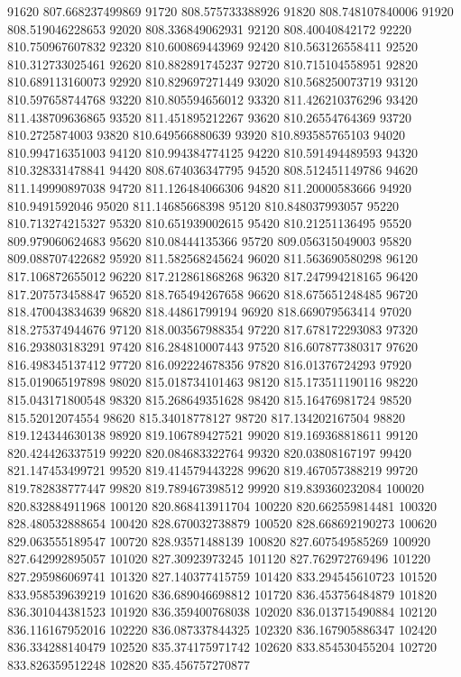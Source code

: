{91620 807.668237499869
91720 808.575733388926
91820 808.748107840006
91920 808.519046228653
92020 808.336849062931
92120 808.40040842172
92220 810.750967607832
92320 810.600869443969
92420 810.563126558411
92520 810.312733025461
92620 810.882891745237
92720 810.715104558951
92820 810.689113160073
92920 810.829697271449
93020 810.568250073719
93120 810.597658744768
93220 810.805594656012
93320 811.426210376296
93420 811.438709636865
93520 811.451895212267
93620 810.26554764369
93720 810.2725874003
93820 810.649566880639
93920 810.893585765103
94020 810.994716351003
94120 810.994384774125
94220 810.591494489593
94320 810.328331478841
94420 808.674036347795
94520 808.512451149786
94620 811.149990897038
94720 811.126484066306
94820 811.20000583666
94920 810.9491592046
95020 811.14685668398
95120 810.848037993057
95220 810.713274215327
95320 810.651939002615
95420 810.21251136495
95520 809.979060624683
95620 810.08444135366
95720 809.056315049003
95820 809.088707422682
95920 811.582568245624
96020 811.563690580298
96120 817.106872655012
96220 817.212861868268
96320 817.247994218165
96420 817.207573458847
96520 818.765494267658
96620 818.675651248485
96720 818.470043834639
96820 818.44861799194
96920 818.669079563414
97020 818.275374944676
97120 818.003567988354
97220 817.678172293083
97320 816.293803183291
97420 816.284810007443
97520 816.607877380317
97620 816.498345137412
97720 816.092224678356
97820 816.01376724293
97920 815.019065197898
98020 815.018734101463
98120 815.173511190116
98220 815.043171800548
98320 815.268649351628
98420 815.16476981724
98520 815.52012074554
98620 815.34018778127
98720 817.134202167504
98820 819.124344630138
98920 819.106789427521
99020 819.169368818611
99120 820.424426337519
99220 820.084683322764
99320 820.03808167197
99420 821.147453499721
99520 819.414579443228
99620 819.467057388219
99720 819.782838777447
99820 819.789467398512
99920 819.839360232084
100020 820.832884911968
100120 820.868413911704
100220 820.662559814481
100320 828.480532888654
100420 828.670032738879
100520 828.668692190273
100620 829.063555189547
100720 828.93571488139
100820 827.607549585269
100920 827.642992895057
101020 827.30923973245
101120 827.762972769496
101220 827.295986069741
101320 827.140377415759
101420 833.294545610723
101520 833.958539639219
101620 836.689046698812
101720 836.453756484879
101820 836.301044381523
101920 836.359400768038
102020 836.013715490884
102120 836.116167952016
102220 836.087337844325
102320 836.167905886347
102420 836.334288140479
102520 835.374175971742
102620 833.854530455204
102720 833.826359512248
102820 835.456757270877
}

